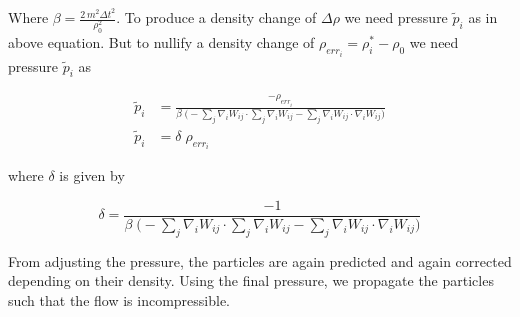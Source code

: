 Where $\beta=\frac{2\,m^2 \Delta t^2}{\rho_0^2}$. To produce a density change
of $\Delta \rho$ we need pressure $\widetilde{p}_i$ as in above equation. But to
nullify a density change of $\rho_{err_i} = \rho_i^* - \rho_0$ we need pressure
$\widetilde{p}_i$ as

\begin{align*}
  \widetilde{p}_i &= \frac{-\rho_{err_i}}{\beta \; \bigg(- \sum_j
                    \nabla_i W_{ij} \cdot \sum_j \nabla_i W_{ij} - \sum_j \nabla_i W_{ij} \cdot
                    \nabla_i W_{ij} \bigg)}\\
  \widetilde{p}_i &= \delta \; \rho_{err_i}
\end{align*}

where $\delta$ is given by

\begin{equation}
  \label{eq:pcisph_delta}
  \delta = \frac{-1}{\beta \; \bigg(- \sum_j \nabla_i
    W_{ij} \cdot \sum_j \nabla_i W_{ij} - \sum_j \nabla_i W_{ij} \cdot \nabla_i
    W_{ij} \bigg)}
\end{equation}

From adjusting the pressure, the particles are again predicted and again
corrected depending on their density. Using the final pressure, we propagate the particles
such that the flow is incompressible.


